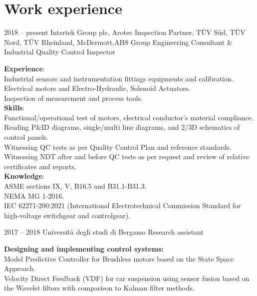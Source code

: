 \documentclass[fontsize=12pt]{tccv}
\begin{document}
	\section{Work experience}
	
	\begin{eventlist}
		\item{2018 -- present}
		{Intertek Group plc, Arotec Inspection Partner, TÜV Süd, TÜV Nord, TÜV Rheinland, McDermott,ABS Group}
		{Engineering Consultant \& \\ Industrial Quality Control Inspector}
		
		\small \textbf{Experience}:\\
		\small *Industrial sensors and instrumentation fittings equipments and calibration.\\
		\small *Electrical motors and Electro-Hydraulic, Solenoid Actuators.\\
		\small *Inspection of measurement and process tools.\\
		
		\small \textbf{Skills}:\\
		\small *Functional/operational test of motors, electrical conductor's material compliance.\\
		\small *Reading P\&ID diagrams, single/multi line diagrams, and 2/3D schematics of control panels.\\
		\small *Witnessing QC tests as per Quality Control Plan and reference standards.\\
		\small *Witnessing NDT after and before QC tests as per request and review of relative certificates and reports.\\
		
		\small \textbf{Knowledge}:\\
		\small *ASME sections IX, V, B16.5 and B31.1-B31.3.\\
		\small *NEMA MG 1-2016.\\
		\small *IEC 62271-200:2021 (International Electrotechnical Commission Standard for high-voltage switchgear and controlgear).\\
		
		\item{2017 -- 2018}
		{Università degli studi di Bergamo}
		{Research assistant}
		
		\small \textbf{Designing and implementing control systems:}\\
		\small * Model Predictive Controller for Brushless motors based on the State Space Approach.\\
		\small * Velocity Direct Feedback (VDF) for car suspension using sensor fusion based on the Wavelet filters with comparison to Kalman filter methods.
		

\end{eventlist}
\end{document}

